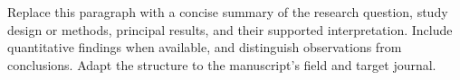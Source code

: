 Replace this paragraph with a concise summary of the research question, study design or methods, principal results, and their supported interpretation. Include quantitative findings when available, and distinguish observations from conclusions. Adapt the structure to the manuscript's field and target journal.
